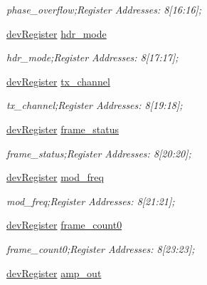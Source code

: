 \begin{DoxyCompactItemize}
\begin{DoxyCompactList}\small\item\em phase\+\_\+overflow;Register Addresses\+: 8\mbox{[}16\+:16\mbox{]}; \end{DoxyCompactList}\item 
\mbox{\hyperlink{classdev_register}{dev\+Register}} \mbox{\hyperlink{class_o_p_t3101_registers_ad92bd09c7b71504a6d704738f947423b}{hdr\+\_\+mode}}
\begin{DoxyCompactList}\small\item\em hdr\+\_\+mode;Register Addresses\+: 8\mbox{[}17\+:17\mbox{]}; \end{DoxyCompactList}\item 
\mbox{\hyperlink{classdev_register}{dev\+Register}} \mbox{\hyperlink{class_o_p_t3101_registers_af8dff0a66f3d0812d59ee8ac70213f65}{tx\+\_\+channel}}
\begin{DoxyCompactList}\small\item\em tx\+\_\+channel;Register Addresses\+: 8\mbox{[}19\+:18\mbox{]}; \end{DoxyCompactList}\item 
\mbox{\hyperlink{classdev_register}{dev\+Register}} \mbox{\hyperlink{class_o_p_t3101_registers_ab427247d50013b769b056112f8d06068}{frame\+\_\+status}}
\begin{DoxyCompactList}\small\item\em frame\+\_\+status;Register Addresses\+: 8\mbox{[}20\+:20\mbox{]}; \end{DoxyCompactList}\item 
\mbox{\hyperlink{classdev_register}{dev\+Register}} \mbox{\hyperlink{class_o_p_t3101_registers_a264e99791a65b5de4ffab4cdf628ba68}{mod\+\_\+freq}}
\begin{DoxyCompactList}\small\item\em mod\+\_\+freq;Register Addresses\+: 8\mbox{[}21\+:21\mbox{]}; \end{DoxyCompactList}\item 
\mbox{\hyperlink{classdev_register}{dev\+Register}} \mbox{\hyperlink{class_o_p_t3101_registers_a2eb6ec41e5d3e44a76e490d42198409b}{frame\+\_\+count0}}
\begin{DoxyCompactList}\small\item\em frame\+\_\+count0;Register Addresses\+: 8\mbox{[}23\+:23\mbox{]}; \end{DoxyCompactList}\item 
\mbox{\hyperlink{classdev_register}{dev\+Register}} \mbox{\hyperlink{class_o_p_t3101_registers_a501629ec4152d76e3c5fadc997a22e2d}{amp\+\_\+out}}

\end{DoxyCompactItemize}
